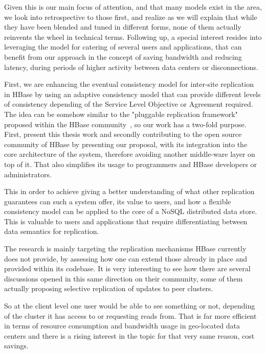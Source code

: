 Given this is our main focus of attention, and that many models exist in the area, we look into retrospective to those first, and realize as we will explain that while they have been blended and tuned in different forms, none of them actually reinvents the wheel in technical terms. Following up, a special interest resides into leveraging the model for catering of several users and applications, that can benefit from our approach in the concept of saving bandwidth and reducing latency, during periods of higher activity between data centers or disconnections.

First, we are enhancing the eventual consistency model for inter-site replication in HBase by using an adaptive consistency model that can provide different levels of consistency depending of the Service Level Objective or Agreement required. The idea can be somehow similar to the "pluggable replication framework" proposed within the HBase community~\cite{JIRA-1}, so our work has a two-fold purpose. First, present this thesis work and secondly contributing to the open source community of HBase by presenting our proposal, with its integration into the core architecture of the system, therefore avoiding another middle-ware layer on top of it. That also simplifies its usage to programmers and HBase developers or administrators.

This in order to achieve giving a better understanding of what other replication guarantees can such a system offer, its value to users, and how a flexible consistency model can be applied to the core of a NoSQL distributed data store. This is valuable to users and applications that require differentiating between data semantics for replication. 

The research is mainly targeting the replication mechanisms HBase currently does not provide, by assessing how one can extend those already in place and provided within its codebase. It is very interesting to see how there are several discussions opened in this same direction on their community, some of them actually proposing selective replication of updates to peer clusters. 

So at the client level one user would be able to see something or not, depending of the cluster it has access to or requesting reads from. That is far more efficient in terms of resource consumption and bandwidth usage in geo-located data centers and there is a rising interest in the topic for that very same reason, cost savings.



